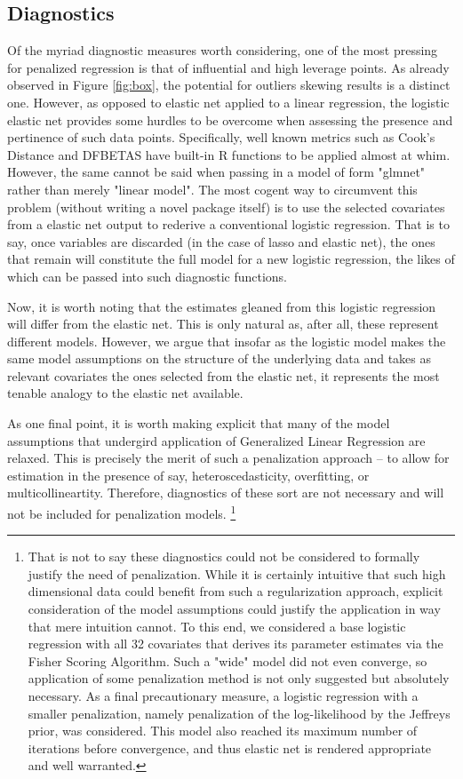 \documentclass[11pt]{article}
\begin{document}
\subsection{Diagnostics}
	Of the myriad diagnostic measures worth considering, one of the most pressing for penalized regression is that of influential and high leverage points.  As already observed in Figure \ref{fig:box}, the potential for outliers skewing results is a distinct one.  However, as opposed to elastic net applied to a linear regression, the logistic elastic net provides some hurdles to be overcome when assessing the presence and pertinence of such data points.  Specifically, well known metrics such as Cook's Distance and DFBETAS have built-in R functions to be applied almost at whim.  However, the same cannot be said when passing in a model of form "glmnet" rather than merely "linear model".  The most cogent way to circumvent this problem (without writing a novel package itself) is to use the selected covariates from a elastic net output to rederive a conventional logistic regression.  That is to say, once variables are discarded (in the case of lasso and elastic net), the ones that remain will constitute the full model for a new logistic regression, the likes of which can be passed into such diagnostic functions.  
	
	Now, it is worth noting that the estimates gleaned from this logistic regression will differ from the elastic net.  This is only natural as, after all, these represent different models.  However, we argue that insofar as the logistic model makes the same model assumptions on the structure of the underlying data and takes as relevant covariates the ones selected from the elastic net, it represents the most tenable analogy to the elastic net available.  
	
	As one final point, it is worth making explicit that many of the model assumptions that undergird application of  Generalized Linear Regression are relaxed.  This is precisely the merit of such a penalization approach -- to allow for estimation in the presence of say, heteroscedasticity, overfitting, or multicollineartity.  Therefore, diagnostics of these sort are not necessary and will not be included for penalization models.  \footnote {That is not to say these diagnostics could not be considered to formally justify the need of penalization.  While it is certainly intuitive that such high dimensional data could benefit from such a regularization approach, explicit consideration of the model assumptions could justify the application in way that mere intuition cannot.  To this end, we considered a base logistic regression with all 32 covariates that derives its parameter estimates via the Fisher Scoring Algorithm.  Such a "wide" model did not even converge, so application of some penalization method is not only suggested but absolutely necessary.  As a final precautionary measure, a logistic regression with a smaller penalization, namely penalization of the log-likelihood by the Jeffreys prior, was considered.  This model also reached its maximum number of iterations before convergence, and thus elastic net is rendered appropriate and well warranted.}
\end{document}
